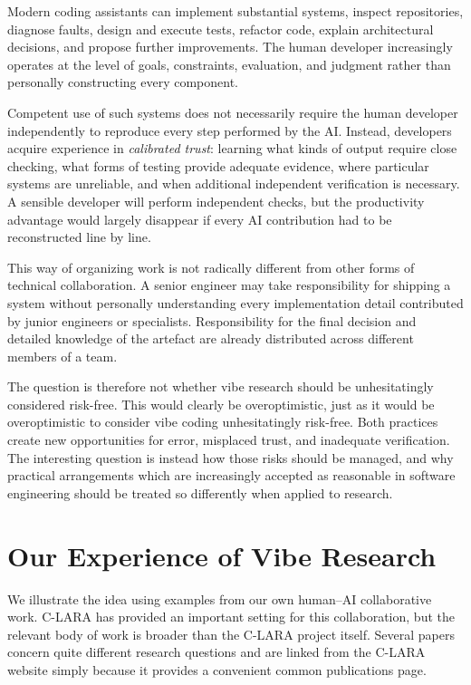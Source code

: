 Modern coding assistants can implement substantial systems, inspect repositories, diagnose faults, design and execute tests, refactor code, explain architectural decisions, and propose further improvements. The human developer increasingly operates at the level of goals, constraints, evaluation, and judgment rather than personally constructing every component.

Competent use of such systems does not necessarily require the human developer independently to reproduce every step performed by the AI. Instead, developers acquire experience in \emph{calibrated trust}: learning what kinds of output require close checking, what forms of testing provide adequate evidence, where particular systems are unreliable, and when additional independent verification is necessary. A sensible developer will perform independent checks, but the productivity advantage would largely disappear if every AI contribution had to be reconstructed line by line.

This way of organizing work is not radically different from other forms of technical collaboration. A senior engineer may take responsibility for shipping a system without personally understanding every implementation detail contributed by junior engineers or specialists. Responsibility for the final decision and detailed knowledge of the artefact are already distributed across different members of a team.

The question is therefore not whether vibe research should be unhesitatingly considered risk-free. This would clearly be overoptimistic, just as it would be overoptimistic to consider vibe coding unhesitatingly risk-free. Both practices create new opportunities for error, misplaced trust, and inadequate verification. The interesting question is instead how those risks should be managed, and why practical arrangements which are increasingly accepted as reasonable in software engineering should be treated so differently when applied to research.


\section{Our Experience of Vibe Research}

We illustrate the idea using examples from our own human--AI collaborative work. C-LARA has provided an important setting for this collaboration, but the relevant body of work is broader than the C-LARA project itself. Several papers concern quite different research questions and are linked from the C-LARA website simply because it provides a convenient common publications page.

